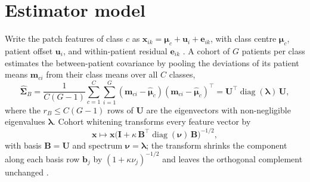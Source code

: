 \documentclass[11pt]{article}
\begin{document}
\section{Estimator model}
\label{sec:model}
Write the patch features of class $c$ as $\mathbf x_{ik}=\boldsymbol\mu_c+\mathbf u_i+\mathbf e_{ik}$, with class centre $\boldsymbol\mu_c$, patient offset $\mathbf u_i$, and within-patient residual $\mathbf e_{ik}$ \citep{queisler2026centreError}. A cohort of $G$ patients per class estimates the between-patient covariance by pooling the deviations of its patient means $\mathbf m_{ci}$ from their class means over all $C$ classes,
\begin{equation}
  \hat{\boldsymbol\Sigma}_B=\frac{1}{C(G-1)}\sum_{c=1}^{C}\sum_{i=1}^{G}(\mathbf m_{ci}-\hat{\boldsymbol\mu}_c)(\mathbf m_{ci}-\hat{\boldsymbol\mu}_c)^\top
  =\mathbf U^\top\operatorname{diag}(\boldsymbol\lambda)\,\mathbf U ,
  \label{eq:cov}
\end{equation}
\noindent where the $r_B\leq C(G-1)$ rows of $\mathbf U$ are the eigenvectors with non-negligible eigenvalues $\boldsymbol\lambda$. Cohort whitening transforms every feature vector by
\begin{equation}
  \mathbf x\mapsto\mathbf x\bigl(\mathbf I+\kappa\,\mathbf B^\top\operatorname{diag}(\boldsymbol\nu)\,\mathbf B\bigr)^{-1/2},
  \label{eq:whiten}
\end{equation}
\noindent with basis $\mathbf B=\mathbf U$ and spectrum $\boldsymbol\nu=\boldsymbol\lambda$; the transform shrinks the component along each basis row $\mathbf b_j$ by $(1+\kappa\nu_j)^{-1/2}$ and leaves the orthogonal complement unchanged \citep{queisler2026patientDirections}.
\end{document}
